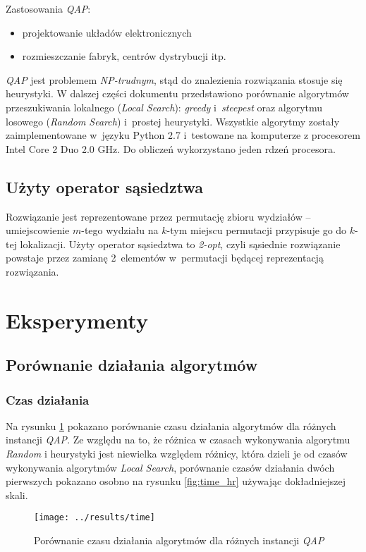 \documentclass{article}
\begin{document}
	Zastosowania \emph{QAP}:
	\begin{itemize}
		\item{projektowanie układów elektronicznych}
		\item{rozmieszczanie fabryk, centrów dystrybucji itp.}
	\end{itemize}
	
	\emph{QAP} jest problemem \emph{NP-trudnym}, stąd do znalezienia rozwiązania stosuje się heurystyki. W dalszej części dokumentu przedstawiono porównanie algorytmów przeszukiwania lokalnego (\emph{Local Search}): \emph{greedy} i~\emph{steepest} oraz algorytmu losowego (\emph{Random Search}) i~prostej heurystyki. Wszystkie algorytmy zostały zaimplementowane w~języku Python 2.7 i~testowane na komputerze z procesorem Intel Core 2 Duo 2.0 GHz. Do obliczeń wykorzystano jeden rdzeń procesora.

	\subsection{Użyty operator sąsiedztwa\label{ss:operator}}
	Rozwiązanie jest reprezentowane przez permutację zbioru wydziałów -- umiejscowienie $m$-tego wydziału na $k$-tym miejscu permutacji przypisuje go do $k$-tej lokalizacji.
	Użyty operator sąsiedztwa to \emph{2-opt}, czyli sąsiednie rozwiązanie powstaje przez zamianę 2~elementów w~permutacji będącej reprezentacją rozwiązania.

\section{Eksperymenty}
	\subsection{Porównanie działania algorytmów}
		\subsubsection{Czas działania}Na rysunku \ref{fig:time} pokazano porównanie czasu działania algorytmów dla różnych instancji \emph{QAP}. Ze względu na to, że różnica w czasach wykonywania algorytmu \emph{Random} i heurystyki jest niewielka względem różnicy, która dzieli je od czasów wykonywania algorytmów \emph{Local Search}, porównanie czasów działania dwóch pierwszych pokazano osobno na rysunku \ref{fig:time_hr} używając dokładniejszej skali.
			\begin{figure}[h]
				\texttt{[image: ../results/time]}
				\caption{Porównanie czasu działania algorytmów dla różnych instancji \emph{QAP}\label{fig:time}}
			\end{figure}
			
\end{document}
